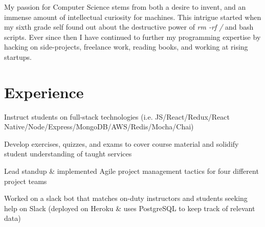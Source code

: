 \documentclass[letterpaper]{deedy-resume} %
\begin{document}
\begin{minipage}[t]{0.66\textwidth} %


  My passion for Computer Science stems from both a desire to invent,
  and an immense amount of intellectual curiosity for machines. This
  intrigue started when my sixth grade self found
  out about the destructive power of {\it rm -rf /} and bash scripts.
  Ever since then I have continued to further my programming
  expertise by hacking on side-projects, freelance work,
  reading books, and working at rising startups.
  


  \section{Experience}



  \begin{tightitemize}
  \item Instruct students on full-stack technologies (i.e. JS/React/Redux/React Native/Node/Express/MongoDB/AWS/Redis/Mocha/Chai)
  \item Develop exercises, quizzes, and exams to cover course material and solidify student understanding of taught services
  \item Lead standup \& implemented Agile project management tactics for four different project teams
  \item Worked on a slack bot that matches on-duty instructors and students seeking help on Slack (deployed on Heroku \& uses PostgreSQL to keep track of relevant data)
  \end{tightitemize}

  \sectionspace %



\end{minipage}
\end{document}
